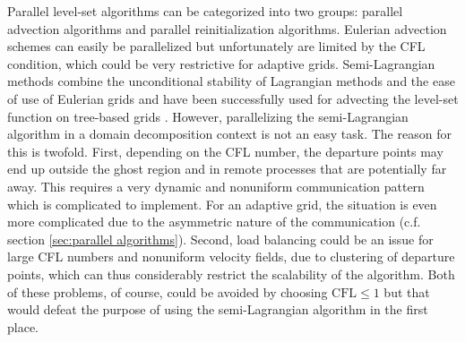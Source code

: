 Parallel level-set algorithms can be categorized into two groups: parallel advection algorithms and parallel reinitialization algorithms. Eulerian advection schemes can easily be parallelized but unfortunately are limited by the CFL condition, which could be very restrictive for adaptive grids. Semi-Lagrangian methods combine the unconditional stability of Lagrangian methods and the ease of use of Eulerian grids and have been successfully used for advecting the level-set function on tree-based grids \cite{Losasso;Gibou;Fedkiw:04:Simulating-Water-and, Losasso;Fedkiw;Osher:06:Spatially-Adaptive-T, Min;Gibou:07:A-second-order-accur}. However, parallelizing the semi-Lagrangian algorithm in a domain decomposition context is not an easy task. The reason for this is twofold. First, depending on the CFL number, the departure points may end up outside the ghost region and in remote processes that are potentially far away. This requires a very dynamic and nonuniform communication pattern which is complicated to implement. For an adaptive grid, the situation is even more complicated due to the asymmetric nature of the communication (c.f. section \ref{sec:parallel algorithms}). Second, load balancing could be an issue for large CFL numbers and nonuniform velocity fields, due to clustering of departure points, which can thus considerably restrict the scalability of the algorithm. Both of these problems, of course, could be avoided by choosing $\text{CFL} \le 1$ but that would defeat the purpose of using the semi-Lagrangian algorithm in the first place. 

